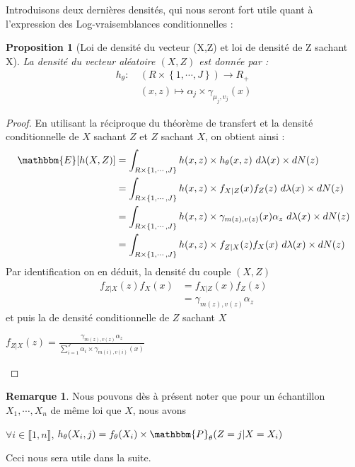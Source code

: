 \documentclass[frenchb]{report}
\newcommand{\1}{\mathbbm{1}}
\newcommand{\E}{\mathbbm{E}}
\newcommand{\prob}{\mathbbm{P}}
\newtheorem{prop}{Proposition}
\theoremstyle{definition}\newtheorem{defn}{Définition}
\theoremstyle{definition}\newtheorem{exm}{Exemple}
\theoremstyle{definition}\newtheorem{nota}{Notation}
\theoremstyle{definition}\newtheorem{rem}{Remarque}
\begin{document}
Introduisons deux dernières densités, qui nous seront fort utile quant à l'expression des Log-vraisemblances conditionnelles :

\begin{prop}[Loi de densité du vecteur (X,Z) et loi de densité de Z sachant X]
La densité du vecteur aléatoire $(X, Z)$ est donnée par :
\begin{align*} 
h_\theta : &~(R\times \left\{1,\cdots,J\right\}) \rightarrow R_+\\
&~(x,z) \mapsto \alpha_j\times\gamma_{\mu_j, v_j}(x) 
\end{align*}
\end{prop}

\begin{proof}
En utilisant la réciproque du théorème de transfert et la densité conditionnelle de $X$ sachant $Z$ et $Z$ sachant $X$, on obtient ainsi :
\begin{align*} 
\E[h(X,Z)] & = \int_{R\times\left\{1,\cdots,J\right\}}h(x,z)\times h_\theta(x,z)~d\lambda(x)\times dN(z)\\
&= \int_{R\times\left\{1,\cdots,J\right\}}h(x,z)\times f_{X|Z}(x) f_Z(z)~d\lambda(x)\times dN(z)\\
&= \int_{R\times\left\{1,\cdots,J\right\}}h(x,z)\times \gamma_{m(z),v(z)}(x)\alpha_z~d\lambda(x)\times dN(z)\\
&= \int_{R\times\left\{1,\cdots,J\right\}}h(x,z)\times f_{Z|X}(z) f_X(x)~d\lambda(x)\times dN(z)\\
\end{align*}
Par identification on en déduit, la densité du couple $(X,Z)$
\begin{align*}
f_{Z|X}(z) f_X(x) &=  f_{X|Z}(x) f_Z(z)\\
&= \gamma_{m(z),v(z)}\alpha_z
\end{align*}
et puis la de densité conditionnelle de $Z$ sachant $X$
\begin{center}
$f_{Z|X}(z) = \frac{\gamma_{m(z),v(z)}\alpha_z}{\sum_{i=1}^J \alpha_i \times \gamma_{m(i), v(i)}(x)}$
\end{center}
\end{proof}

\begin{rem}
Nous pouvons dès à présent noter que pour un échantillon $X_1, \cdots, X_n$ de même loi que $X$, nous avons 
\begin{center}
$\forall i \in \llbracket 1,n \rrbracket$, $h_\theta(X_i,j) = f_\theta(X_i) \times \prob_\theta(Z = j | X = X_i )$
\end{center}
Ceci nous sera utile dans la suite.
\end{rem}
\end{document}
